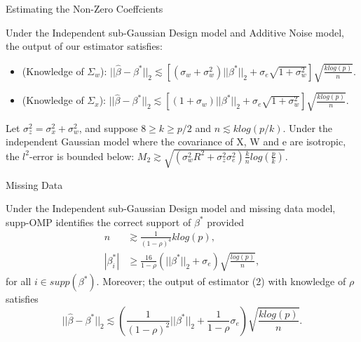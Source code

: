 \documentclass[unknownkeysallowed]{beamer}
\begin{document}
\begin{frame}{Estimating the Non-Zero Coeffcients}
	\begin{theorem}
		Under the Independent sub-Gaussian Design model and Additive Noise model, the output of our estimator satisfies:
		\begin{itemize}
			\item (Knowledge of $\Sigma_w$): $||\hat{\beta} - \beta^*||_2 \lesssim [(\sigma_w + \sigma_w^2)||\beta^*||_2 + \sigma_e \sqrt{1+\sigma_w^2}]\sqrt{\frac{klog(p)}{n}}$.
			\item (Knowledge of $\Sigma_x$): $||\hat{\beta} - \beta^*||_2 \lesssim [(1 + \sigma_w)||\beta^*||_2 + \sigma_e \sqrt{1+\sigma_w^2}]\sqrt{\frac{klog(p)}{n}}$.
		\end{itemize}
	\end{theorem}
\begin{theorem}
	Let $\sigma_z^2 = \sigma_x^2 + \sigma_w^2$, and suppose $8 \geq k \geq p/2$ and $n \lesssim k log (p/k)$. Under the independent Gaussian model where the covariance of X, W and e are isotropic, the $l^2$-error is bounded below: $M_2 \gtrsim \sqrt{(\sigma_w^2 R^2 + \sigma_z^2 \sigma_e^2)\frac{k}{n} log(\frac{p}{k})}$.
\end{theorem}
\end{frame}


\begin{frame}{Missing Data}
	\begin{theorem}
		Under the Independent sub-Gaussian Design model and missing data model, supp-OMP identifies the correct support of $\beta^*$ provided
		\begin{align*}
		n &\gtrsim \frac{1}{(1-\rho)^4}k log(p),\\
		|\beta^*_i| &\geq \frac{16}{1-\rho}(||\beta^*||_2 + \sigma_e) \sqrt{\frac{log(p)}{n}},
		\end{align*}
		for all $i \in supp(\beta^*)$. Moreover; the output of estimator (2) with knowledge of $\rho$ satisfies
		\begin{equation*}
		||\hat{\beta} - \beta^*||_2 \lesssim (\frac{1}{(1-\rho)^2}||\beta^*||_2 + \frac{1}{1-\rho}\sigma_e)\sqrt{\frac{k log(p)}{n}}.
		\end{equation*}
	\end{theorem}
	
\end{frame}
\end{document}
